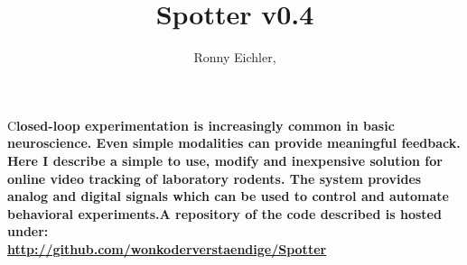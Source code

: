 \documentclass[DIV=calc, paper=a4, fontsize=12pt]{scrartcl}	 %
\title{Spotter v0.4} %
\author{Ronny Eichler, } %
\date{} %
\newcommand{\initial}[1]{ %
\lettrine[lines=3,lhang=0.3,nindent=0em]{
\color{DarkGoldenrod}
{\textsf{#1}}}{}}
\begin{document}
\maketitle %

\thispagestyle{fancy} %


\initial{C}\textbf{losed-loop experimentation is increasingly common in basic neuroscience. Even simple modalities can provide meaningful feedback. Here I describe a simple to use, modify and inexpensive solution for online video tracking of laboratory rodents. The system provides analog and digital signals which can be used to control and automate behavioral experiments.\newline \newline A repository of the code described is hosted under:\\ \url{http://github.com/wonkoderverstaendige/Spotter}}





\clearpage


\end{document}
